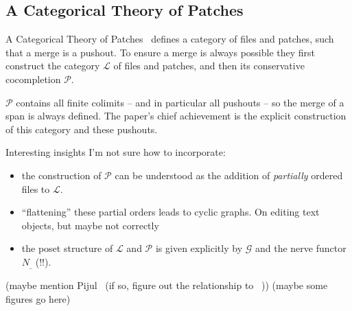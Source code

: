 \subsection{A Categorical Theory of Patches}
A Categorical Theory of Patches~\cite{Categorical2013} defines a category of
files and patches, such that a merge is a pushout. To ensure a merge is always
possible they first construct the category $\mathcal{L}$ of files and patches,
and then its conservative cocompletion $\mathcal{P}$.

$\mathcal{P}$ contains all finite colimits -- and in particular all pushouts --
so the merge of a span is always defined. The paper's chief achievement is the
explicit construction of this category and these pushouts.

Interesting insights I'm not sure how to incorporate:
\begin{itemize}
\item the construction of $\mathcal{P}$ can be understood as the addition of \emph{partially} ordered
  files to $\mathcal{L}$.
\item ``flattening'' these partial orders leads to cyclic graphs. On editing
  text~\cite{editing2014} objects, but maybe not correctly
\item the poset structure of $\mathcal{L}$ and $\mathcal{P}$ is given explicitly
  by $\mathcal{G}$ and the nerve functor $N_{\_}$ (!!).
\end{itemize}

(maybe mention Pijul~\cite{Pijul} (if so, figure out the relationship to ~\cite{Categorical2013}))
(maybe some figures go here)